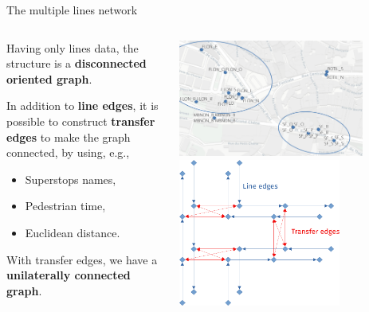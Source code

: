 \documentclass[10pt]{beamer}
\newcommand{\imp}[1]{\textbf{\color{cyan}#1}}
\begin{document}
	\begin{frame}{The multiple lines network}
		\begin{columns}
			\begin{column}{0.5\textwidth}
				Having only lines data, the structure is a \imp{disconnected oriented graph}. \linebreak
				
				In addition to \imp{line edges}, it is possible to construct \imp{transfer edges} to make the graph connected, by using, e.g.,
				\begin{itemize}
					\item Superstops names,
					\item Pedestrian time,
					\item Euclidean distance.
				\end{itemize} 
				\vspace{0.4cm}
				With transfer edges, we have a \imp{unilaterally connected graph}.
			\end{column}
			\begin{column}{0.5\textwidth} 
				\begin{center}
					\includegraphics[width=0.8\textwidth]{img/stop_area_c.png} \\
					\vspace{0.5cm}
					\includegraphics[width=0.7\textwidth]{img/edge_type2.png}
				\end{center}
			\end{column}
		\end{columns}
	\end{frame}
	
\end{document}

